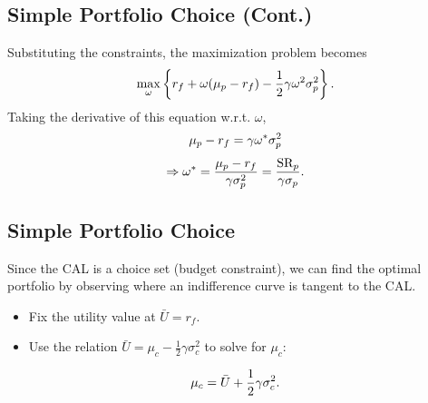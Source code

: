 \documentclass[letterpaper,10pt,english]{sphinxmanual}
\begin{document}
\subsection{Simple Portfolio Choice (Cont.)}
\label{allocation:simple-portfolio-choice-cont}
Substituting the constraints, the maximization problem becomes
\begin{gather}
\begin{split}\max_{\omega} \left\{r_f + \omega (\mu_p - r_f) - \frac{1}{2}
\gamma \omega^2 \sigma^2_p \right\}.\end{split}\notag
\end{gather}
Taking the derivative of this equation w.r.t. $\omega$,
\begin{gather}
\begin{split}\mu_p - r_f  = \gamma \omega^* \sigma^2_p\end{split}\notag
\end{gather}\begin{gather}
\begin{split}\Rightarrow \omega^* = \frac{\mu_p - r_f}{\gamma \sigma^2_p} =
\frac{\text{SR}_p}{\gamma \sigma_p}.\end{split}\notag
\end{gather}

\subsection{Simple Portfolio Choice}
\label{allocation:id5}
Since the CAL is a choice set (budget constraint), we can find the
optimal portfolio by observing where an indifference curve is
tangent to the CAL.
\begin{itemize}
\item {} 
Fix the utility value at $\bar{U} = r_f$.

\end{itemize}
\begin{itemize}
\item {} 
Use the relation $\bar{U} = \mu_c - \frac{1}{2} \gamma
\sigma^2_c$ to solve for $\mu_c$:

\end{itemize}
\begin{gather}
\begin{split}\mu_c = \bar{U} + \frac{1}{2} \gamma \sigma^2_c.\end{split}\notag
\end{gather}
\end{document}
